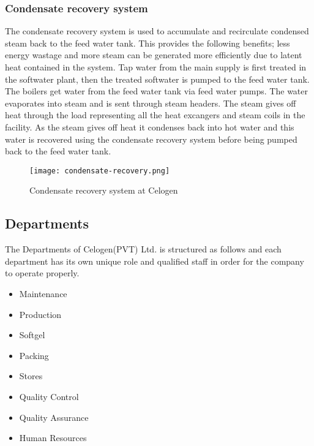 \documentclass[a4paper,12pt]{article}
\begin{document}
			\subsubsection*{Condensate recovery system}
				
				The condensate recovery system is used to accumulate and recirculate condensed steam back to the feed water tank.
				This provides the following benefits; less energy wastage and more steam can be generated more efficiently due to latent heat contained in the system.
				Tap water from the main supply is first treated in the softwater plant, then the treated softwater is pumped to the feed water tank.
				The boilers get water from the feed water tank via feed water pumps.
				The water evaporates into steam and is sent through steam headers.
				The steam gives off heat through the load representing all the heat excangers and steam coils in the facility.
				As the steam gives off heat it condenses back into hot water and this  water is recovered using the condensate recovery system before being pumped back to the feed water tank.
				  
				
				\begin{figure}[H]
					\centering
					\texttt{[image: condensate-recovery.png]}
					\caption{Condensate recovery system at Celogen}
					\label{fig:condensate-recovery}
				\end{figure}
				
		\newpage	
		\subsection{Departments}
		The Departments of Celogen(PVT) Ltd. is structured as follows and each department has its own unique role and qualified staff in order for the company to operate properly.
					
				
						\begin{itemize}
							\item	Maintenance
							\item	Production
							\item	Softgel
							\item	Packing
							\item 	Stores
							\item	Quality Control
							\item	Quality Assurance
							\item	Human Resources
						\end{itemize}
						
\end{document}
